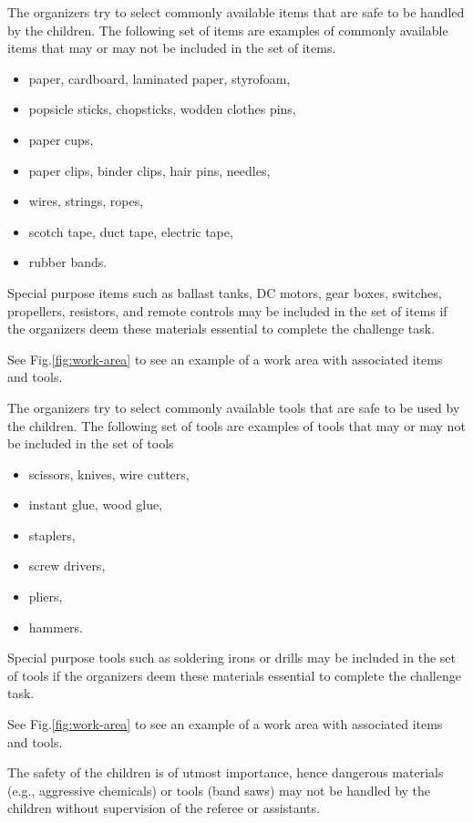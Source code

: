 \documentclass[12pt]{hurocup}
\begin{document}
\begin{decisions}

\item \label{dec-items} The organizers try to select commonly
  available items that are safe to be handled by the children. The
  following set of items are examples of commonly available items that
  may or may not be included in the set of items.
  \begin{itemize}
    \item paper, cardboard, laminated paper, styrofoam, 
    \item popsicle sticks, chopsticks, wodden clothes pins,
    \item paper cups,
    \item paper clips, binder clips, hair pins, needles,
    \item wires, strings, ropes, 
    \item scotch tape, duct tape, electric tape,
    \item rubber bands.
  \end{itemize}

  Special purpose items such as ballast tanks, DC motors, gear boxes,
  switches, propellers, resistors, and remote controls may be included
  in the set of items if the organizers deem these materials essential
  to complete the challenge task.
      
  See Fig.\ref{fig:work-area} to see an example of a work area with
  associated items and tools.

\item \label{dec-tools} The organizers try to select commonly
  available tools that are safe to be used by the children. The
  following set of tools are examples of tools that may or may not be
  included in the set of tools

  \begin{itemize}
    \item scissors, knives, wire cutters,
    \item instant glue, wood glue, 
    \item staplers,
    \item screw drivers,
    \item pliers,
    \item hammers.
  \end{itemize}
  
  Special purpose tools such as soldering irons or drills may be
  included in the set of tools if the organizers deem these materials
  essential to complete the challenge task.

  See Fig.\ref{fig:work-area} to see an example of a work area with
  associated items and tools.

\item The safety of the children is of utmost importance, hence
  dangerous materials (e.g., aggressive chemicals) or tools (band
  saws) may not be handled by the children without supervision of the
  referee or assistants.

\end{decisions}
\end{document}
